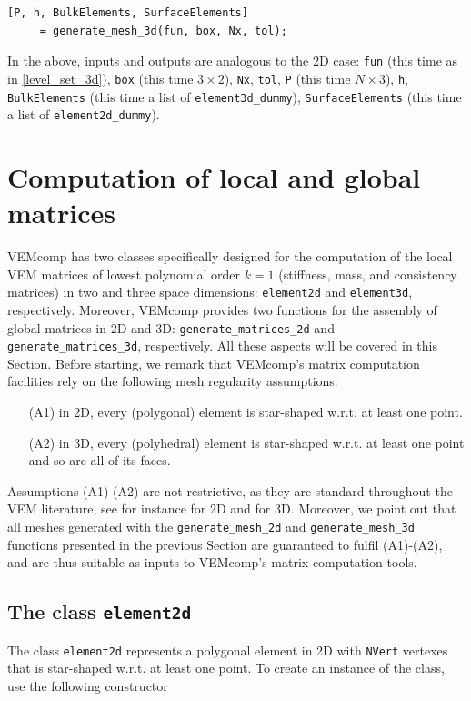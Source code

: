 \documentclass[a4paper]{article}
\begin{document}
\begin{lstlisting}
[P, h, BulkElements, SurfaceElements]
     = generate_mesh_3d(fun, box, Nx, tol);
\end{lstlisting}
In the above,  inputs and outputs are analogous to the 2D case: \texttt{fun} (this time as in \eqref{level_set_3d}),  \texttt{box} (this time $3\times 2$), \texttt{Nx}, \texttt{tol}, 
\texttt{P} (this time $N\times 3$),  \texttt{h}, \texttt{BulkElements} (this time a list of \texttt{element3d\_dummy}), \texttt{SurfaceElements} (this time a list of \texttt{element2d\_dummy}).


\section{Computation of local and global matrices}
\label{sec:computation_local_matrices}
VEMcomp has two classes specifically designed for the computation of the local VEM matrices of lowest polynomial order $k=1$ (stiffness, mass, and consistency matrices) in two and three space dimensions: \texttt{element2d} and \texttt{element3d}, respectively.  Moreover, VEMcomp provides two functions for the assembly of global matrices in 2D and 3D: \texttt{generate\_matrices\_2d} and \texttt{generate\_matrices\_3d}, respectively.  All these aspects will be covered in this Section.  Before starting, we remark that VEMcomp's matrix computation facilities rely on the following mesh regularity assumptions:
\begin{itemize}
\item[(A1)] in 2D, every (polygonal) element is star-shaped w.r.t. at least one point.
\item[(A2)] in 3D, every (polyhedral) element is star-shaped w.r.t. at least one point and so are all of its faces.
\end{itemize}
Assumptions (A1)-(A2) are not restrictive, as they are standard throughout the VEM literature, see for instance \cite{Beirao_da_Veiga_2017_stability} for 2D and \cite{da2017high} for 3D. Moreover, we point out that all meshes generated with the \texttt{generate\_mesh\_2d} and \texttt{generate\_mesh\_3d} functions presented in the previous Section are guaranteed to fulfil (A1)-(A2), and are thus suitable as inputs to VEMcomp's matrix computation tools.

\subsection{The class \texttt{element2d}}
The class \texttt{element2d} represents a polygonal element in 2D with \texttt{NVert} vertexes that is star-shaped w.r.t. at least one point. To create an instance of the class, use the following constructor
\end{document}
